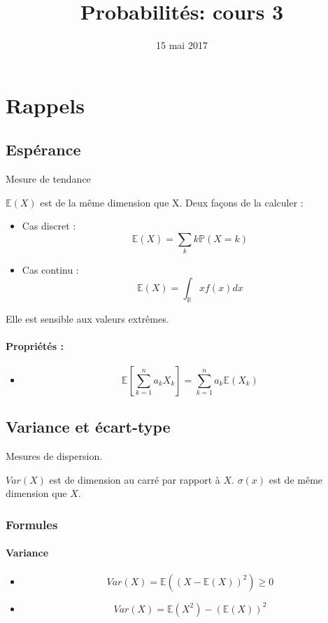 \documentclass{article}
\title{Probabilités: cours 3}
\date{15 mai 2017}
\begin{document}
\maketitle

\section{Rappels}
\subsection{Espérance}

Mesure de tendance


$\mathbb{E}(X)$ est de la même dimension que X. Deux façons de la calculer :
\begin{itemize}
  \item Cas discret : $$ \mathbb{E}(X) = \sum_k k\mathbb{P}(X=k) $$
  \item Cas continu : $$ \mathbb{E}(X) = \int_{\mathbb{R}}xf(x)dx $$
\end{itemize}

Elle est sensible aux valeurs extrêmes.

\paragraph{Propriétés :}

\begin{itemize}
  \item $$ \mathbb{E}[\sum_{k=1}^n a_k X_k] = \sum_{k=1}^n a_k \mathbb{E}(X_k) $$
\end{itemize}

\subsection{Variance et écart-type}

Mesures de dispersion.

$\textit{Var}(X)$ est de dimension au carré par rapport à $X$.
$\sigma(x)$ est de même dimension que $X$.

\subsubsection{Formules}
\paragraph{Variance}
\begin{itemize}
  \item $$ \textit{Var}(X) = \mathbb{E}((X - \mathbb{E}(X))^2)  \geq 0$$
  \item $$ \textit{Var}(X) = \mathbb{E}(X^2) - (\mathbb{E}(X))^2 $$
\end{itemize}
\end{document}
